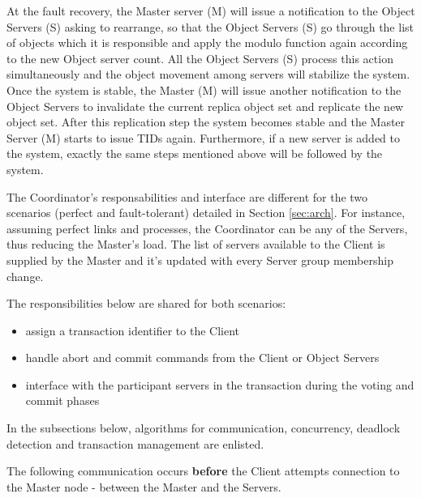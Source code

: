 \documentclass[times, 10pt,twocolumn]{article}
\begin{document}
At the fault recovery, the Master server (M) will issue a notification to the Object Servers (S) asking to rearrange, so that the Object Servers (S) go through the list of objects which it is responsible and apply the modulo function again according to the new Object server count. All the Object Servers (S) process this action simultaneously and the object movement among servers will stabilize the system. Once the system is stable, the Master (M) will issue another notification to the Object Servers to invalidate the current replica object set and replicate the new object set. After this replication step the system becomes stable and the Master Server (M) starts to issue TIDs again. Furthermore, if a new server is added to the system, exactly the same steps mentioned above will be followed by the system.

\label{subsec:respon}

The Coordinator's responsabilities and interface are different for the two scenarios (perfect and fault-tolerant) detailed in Section \ref{sec:arch}. For instance, assuming perfect links and processes, the Coordinator can be any of the Servers, thus reducing the Master's load. The list of servers available to the Client is supplied by the Master and it's updated with every Server group membership change.

The responsibilities below are shared for both scenarios:
\begin{itemize}[noitemsep,nolistsep]
\item assign a transaction identifier to the Client 
\item handle abort and commit commands from the Client or Object Servers 
\item interface with the participant servers in the transaction during the voting and commit phases 
\end{itemize}

\label{sec:algor}
In the subsections below, algorithms for communication, concurrency, deadlock detection and transaction management are enlisted.

The following communication occurs {\bf before} the Client attempts connection to the Master node - between the Master and the Servers.
\end{document}
